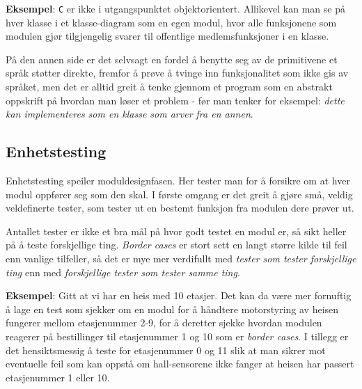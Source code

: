 \textbf{Eksempel}: \verb|C| er ikke i utgangspunktet objektorientert. Allikevel kan man se på hver klasse i et klasse-diagram som en egen modul, hvor alle funksjonene som modulen gjør tilgjengelig svarer til offentlige medlemsfunksjoner i en klasse.

På den annen side er det selvsagt en fordel å benytte seg av de primitivene et språk støtter direkte, fremfor å prøve å tvinge inn funksjonalitet som ikke gis av språket, men det er alltid greit å tenke gjennom et program som en abstrakt oppskrift på hvordan man løser et problem - før man tenker for eksempel: \textit{dette kan implementeres som en klasse som arver fra en annen}.

\subsection{Enhetstesting}


Enhetstesting speiler moduldesignfasen. Her tester man for å forsikre om at hver modul oppfører seg som den skal. I første omgang er det greit å gjøre små, veldig veldefinerte tester, som tester ut en bestemt funksjon fra modulen dere prøver ut.

Antallet tester er ikke et bra mål på hvor godt testet en modul er, så sikt heller på å teste forskjellige ting. \textit{Border cases} er stort sett en langt større kilde til feil enn vanlige tilfeller, så det er mye mer verdifullt med \textit{tester som tester forskjellige ting} enn med \textit{forskjellige tester som tester samme ting}.

\textbf{Eksempel}: Gitt at vi har en heis med 10 etasjer. Det kan da være mer fornuftig å lage en test som sjekker om en modul for å håndtere motorstyring av heisen fungerer mellom etasjenummer 2-9, for å deretter sjekke hvordan modulen reagerer på bestillinger til etasjenummer 1 og 10 som er \textit{border cases}. I tillegg er det hensiktsmessig å teste for etasjenummer 0 og 11 slik at man sikrer mot eventuelle feil som kan oppstå om hall-sensorene ikke fanger at heisen har passert etasjenummer 1 eller 10.



